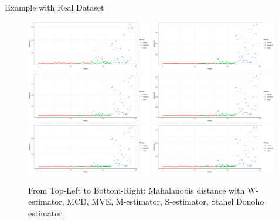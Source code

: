 \documentclass[10pt,xcolor=svgnames]{beamer} %
\begin{document}
\begin{frame}{Example with Real Dataset}
    \begin{figure}
        \centering
        \includegraphics[width = 0.49\textwidth]{Distance-winsor.png}
        \includegraphics[width = 0.49\textwidth]{Distance-mcd.png}
        \includegraphics[width = 0.49\textwidth]{Distance-mve.png}
        \includegraphics[width = 0.49\textwidth]{Distance-Mest.png}
        \includegraphics[width = 0.49\textwidth]{Distance-Sest.png}
        \includegraphics[width = 0.49\textwidth]{Distance-sde.png}
        \caption{From Top-Left to Bottom-Right: Mahalanobis distance with W-estimator, MCD, MVE, M-estimator, S-estimator, Stahel Donoho estimator.}
    \end{figure}
\end{frame}
\end{document}
